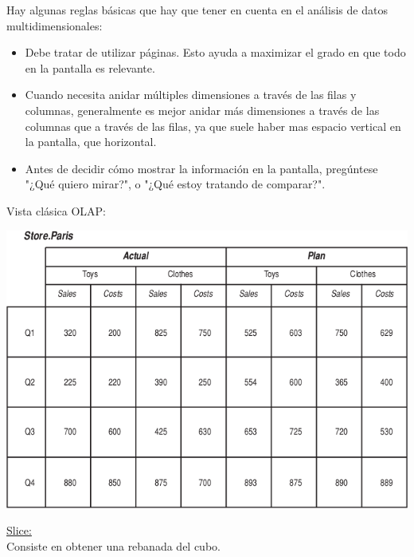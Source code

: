 \documentclass{fancyslides}
\begin{document}
\begin{frame}
\misc
{
Hay algunas reglas básicas que hay que tener en cuenta en el análisis de datos multidimensionales:
\begin{itemize}
  \item Debe tratar de utilizar páginas. Esto ayuda a maximizar el grado en que todo en la pantalla es relevante.
  \item Cuando necesita anidar múltiples dimensiones a través de las filas y columnas, generalmente es mejor anidar más dimensiones a través de las columnas que a través de las filas, ya que suele haber mas espacio vertical en la pantalla, que horizontal.
  \item Antes de decidir cómo mostrar la información en la pantalla, pregúntese "¿Qué quiero mirar?", o "¿Qué estoy tratando de comparar?".
\end{itemize}
}
\end{frame}

\begin{frame}
\misc
{ Vista clásica OLAP:
\begin{center}
\includegraphics[scale=0.4]{cube_10}
\end{center}
}
\end{frame}


\begin{frame}
\end{frame}


\begin{frame}
\misc
{
  \underline{Slice:}\\
  Consiste en obtener una rebanada del cubo.
}
\end{frame}
\end{document}
